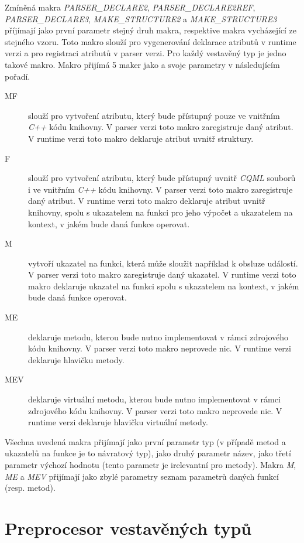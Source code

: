 \documentclass[11pt,twoside,a4paper]{book}
\begin{document}
{{\begin{ttemize}
{{\begin{lastlisting}[frame=single,caption=Řešení v pseudokódu problematického použití operátoru "." v přiřazovacím výroku,label=lst:var0N]
Zmíněná makra \textit{PARSER\_DECLARE2}, \textit{PARSER\_DECLARE2REF}, \textit{PARSER\_DECLARE3}, \textit{MAKE\_STRUCTURE2} a \textit{MAKE\_STRUCTURE3} příjímají jako první parametr stejný druh makra, respektive makra vycházející ze stejného vzoru. Toto makro slouží pro vygenerování deklarace atributů v runtime verzi a pro registraci atributů v parser verzi. Pro každý vestavěný typ je jedno takové makro. Makro přijímá 5 maker jako a svoje parametry v následujícím pořadí.\\
\begin{description}
\item[MF] slouží pro vytvoření atributu, který bude přístupný pouze ve vnitřním \textit{C++} kódu knihovny. V parser verzi toto makro zaregistruje daný atribut. V runtime verzi toto makro deklaruje atribut uvnitř struktury.
\item[F] slouží pro vytvoření atributu, který bude přístupný uvnitř \textit{CQML} souborů i ve vnitřním \textit{C++} kódu knihovny. V parser verzi toto makro zaregistruje daný atribut. V runtime verzi toto makro deklaruje atribut uvnitř knihovny, spolu s ukazatelem na funkci pro jeho výpočet a ukazatelem na kontext, v jakém bude daná funkce  operovat.
\item[M] vytvoří ukazatel na funkci, která může sloužit například k obsluze událostí. V parser verzi toto makro zaregistruje daný ukazatel. V runtime verzi toto makro deklaruje ukazatel na funkci spolu s ukazatelem na kontext, v jakém bude daná funkce operovat. 
\item[ME] deklaruje metodu, kterou bude nutno implementovat v rámci zdrojového kódu knihovny. V parser verzi toto makro neprovede nic. V runtime verzi deklaruje hlavičku metody.
\item[MEV] deklaruje virtuální metodu, kterou bude nutno implementovat v rámci zdrojového kódu knihovny. V parser verzi toto makro neprovede nic. V runtime verzi deklaruje hlavičku virtuální metody.
\end{description}

Všechna uvedená makra přijímají jako první parametr typ (v případě metod a ukazatelů na funkce je to návratový typ), jako druhý parametr název, jako třetí parametr výchozí hodnotu (tento parametr je irelevantní pro metody). Makra \textit{M}, \textit{ME} a \textit{MEV} přijímají jako zbylé parametry seznam parametrů daných funkcí (resp. metod).\\



\section{\label{SEC:aa}Preprocesor vestavěných typů}

\end{lastlisting}}}
\end{ttemize}}}
\end{document}
